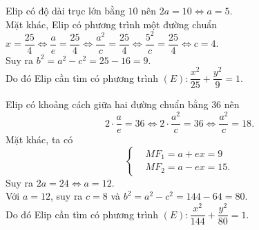 \begin{bt}
{\begin{listEX}
		\item Elip có độ dài trục lớn bằng $10$ nên $2a=10 \Leftrightarrow a=5$.\\
		Mặt khác, Elip có phương trình một đường chuẩn $x=\dfrac{25}{4} \Leftrightarrow \dfrac{a}{e}=\dfrac{25}{4} \Leftrightarrow \dfrac{a^2}{c}=\dfrac{25}{4} \Leftrightarrow \dfrac{5^2}{c}=\dfrac{25}{4} \Leftrightarrow c=4$.\\
		Suy ra $b^2=a^2-c^2=25-16=9$.\\
		Do đó Elip cần tìm có phương trình $(E)\colon \dfrac{x^2}{25}+\dfrac{y^2}{9}=1$.\\
		\item Elip có khoảng cách giữa hai đường chuẩn bằng $36$ nên $$2\cdot \dfrac{a}{e}=36 \Leftrightarrow 2\cdot\dfrac{a^2}{c}=36 \Leftrightarrow \dfrac{a^2}{c}=18.$$
		Mặt khác, ta có $$\left\{\begin{aligned}
		&MF_1=a+ex=9\\
		&MF_2=a-ex=15.
		\end{aligned}\right. $$ Suy ra $2a=24 \Leftrightarrow a=12$.\\
		Với $a=12$, suy ra $c=8$ và $b^2=a^2-c^2=144-64=80$. \\
		Do đó Elip cần tìm có phương trình $(E)\colon \dfrac{x^2}{144}+\dfrac{y^2}{80}=1$.		
	\end{listEX}
}
\end{bt}

